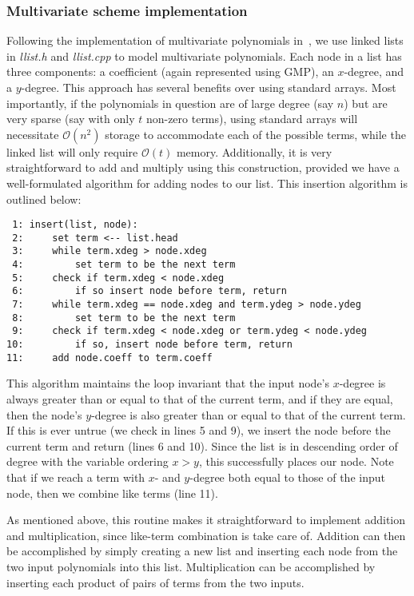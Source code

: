 \documentclass[11pt]{report}
\newcommand{\bigO}{\mathcal{O}}
\begin{document}
\subsubsection{Multivariate scheme implementation}
Following the implementation of multivariate polynomials in~\cite{knuth-vol1}, we use linked lists in \emph{llist.h} and \emph{llist.cpp} to model multivariate polynomials. Each node in a list has three components: a coefficient (again represented using GMP), an $x$-degree, and a $y$-degree. This approach has several benefits over using standard arrays. Most importantly, if the polynomials in question are of large degree (say $n$) but are very sparse (say with only $t$ non-zero terms), using standard arrays will necessitate $\bigO(n^2)$ storage to accommodate each of the possible terms, while the linked list will only require $\bigO(t)$ memory. Additionally, it is very straightforward to add and multiply using this construction, provided we have a well-formulated algorithm for adding nodes to our list. This insertion algorithm is outlined below:

\begin{verbatim}
 1: insert(list, node):
 2:     set term <-- list.head
 3:     while term.xdeg > node.xdeg
 4:         set term to be the next term
 5:     check if term.xdeg < node.xdeg
 6:         if so insert node before term, return
 7:     while term.xdeg == node.xdeg and term.ydeg > node.ydeg
 8:         set term to be the next term
 9:     check if term.xdeg < node.xdeg or term.ydeg < node.ydeg
10:         if so, insert node before term, return
11:     add node.coeff to term.coeff
\end{verbatim}

This algorithm maintains the loop invariant that the input node's $x$-degree is always greater than or equal to that of the current term, and if they are equal, then the node's $y$-degree is also greater than or equal to that of the current term. If this is ever untrue (we check in lines 5 and 9), we insert the node before the current term and return (lines 6 and 10). Since the list is in descending order of degree with the variable ordering $x>y$, this successfully places our node. Note that if we reach a term with $x$- and $y$-degree both equal to those of the input node, then we combine like terms (line 11).

As mentioned above, this routine makes it straightforward to implement addition and multiplication, since like-term combination is take care of. Addition can then be accomplished by simply creating a new list and inserting each node from the two input polynomials into this list. Multiplication can be accomplished by inserting each product of pairs of terms from the two inputs.
\end{document}
